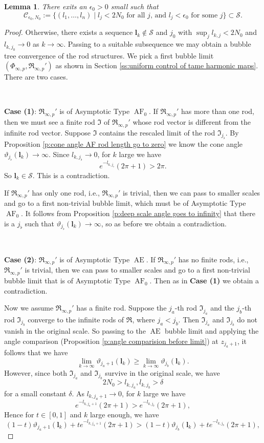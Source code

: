 \documentclass[a4paper,11pt]{amsart}
\newtheorem{lemma}[theorem]{Lemma}
\theoremstyle{definition}
\numberwithin{equation}{section}
\newcommand{\bl}{\bm{l}}
\newcommand{\mI} {\mathfrak I}
\newcommand{\mR} {\mathfrak R}
\DeclareMathOperator{\Ae}{AE}
\DeclareMathOperator{\AF}{AF}
\begin{document}
\begin{lemma}
   There exits an $\epsilon_0>0$ small such that 
    $$\mathcal{C}_{\epsilon_0, N_0}:=\{(l_1,\ldots,l_n)\mid\text{$l_j<2N_0$ for all $j$, and  $l_j<\epsilon_0$ for some $j$}\}\subset\mathcal S.$$
\end{lemma}
\begin{proof}
    Otherwise, there exists a sequence $\bl_k\notin \mathcal S$ and $j_0$ with $\sup_{j}l_{k, j}<2N_0$ and $l_{k,j_0}\rightarrow 0$ as $k\rightarrow\infty$. Passing to a suitable subsequence we may obtain a bubble tree convergence of the rod structures. We pick a first  bubble limit $(\Phi_{\infty, p},\mR_{\infty, p}')$ as shown in Section \ref{ss:uniform control of tame harmonic maps}. There are two cases.

    \
    
    {\bf Case (1)}: $\mR_{\infty, p}'$ is of  Asymptotic Type  $\AF_0$. If $\mR_{\infty, p}'$ has more than one rod, then we must see a finite rod  $\mI$ of $\mR_{\infty, p}'$ whose rod vector is different from the infinite rod vector. Suppose $\mI$ contains the rescaled  limit of the rod $\mI_{j_{\flat}}$. 
     By Proposition \ref{p:cone angle AF rod length go to zero} we know the cone angle $\vartheta_{j_\flat}(\bl_k)\rightarrow\infty$. Since $l_{k,j_\flat}\to0$,  for $k$ large we have  $$e^{-l_{k, j_\flat}}(2\pi+1)>2\pi.$$ So $\bl_k\in \mathcal S$. This is a contradiction. 

If  $\mR_{\infty, p}'$ has only one rod, i.e., $\mR_{\infty, p}'$ is trivial, then we can pass to smaller scales and go to a first non-trivial bubble limit, which must be of Asymptotic Type $\AF_0$. It follows from Proposition \ref{p:deep scale angle goes to infinity} that  there is a $j_\flat$ such that $\vartheta_{j_\flat}(\bl_k)\rightarrow\infty$, so as  before we obtain a contradiction.  

\

{\bf Case (2)}: $\mR_{\infty, p}'$ is of  Asymptotic Type  $\Ae$.  If $\mR_{\infty, p}'$ has no finite rods, i.e., $\mR_{\infty, p}'$ is trivial, then we can pass to smaller scales and go to a first non-trivial bubble limit that is of Asymptotic Type $\AF_0$. Then as in {\bf Case (1)}  we obtain a contradiction.  

Now we assume $\mR_{\infty, p}'$ has a finite rod.  Suppose the $j_a$-th rod $\mathfrak{I}_{j_a}$ and the $j_b$-th rod $\mathfrak{I}_{j_b}$ converge to the infinite rods of $\mR$, where $j_a<j_b$. Then $\mathfrak{I}_{j_a}$ and $\mathfrak{I}_{j_b}$ do not vanish in the original scale. So passing to the $\Ae$ bubble limit and applying the angle  comparison (Proposition \ref{p:angle comparision before limit}) at $z_{j_a+1}$, it follows that we have
    $$\lim_{k\rightarrow\infty}\vartheta_{j_a+1}(\bl_k)\geq \lim_{k\rightarrow\infty}\vartheta_{j_b}(\bl_k).$$
However, since both $\mathfrak{I}_{j_a}$ and $\mathfrak{I}_{j_b}$ survive in the original scale, we have $$2N_0>l_{k, j_a},l_{k, j_b}>\delta$$ for a small constant $\delta$. As $l_{k, j_a+1}\to0$,  for $k$ large we have 
    $$e^{-l_{k,j_a+1}}(2\pi+1)>e^{-l_{k, j_b}}(2\pi+1),$$ 
Hence for $t\in [0, 1]$ and $k$ large enough,  we have
    $$(1-t)\vartheta_{j_a+1}(\bl_k)+te^{-l_{k,j_a+1}}(2\pi+1)>(1-t)\vartheta_{j_b}(\bl_k)+te^{-l_{k,j_b}}(2\pi+1),$$
  

\end{proof}
\end{document}
